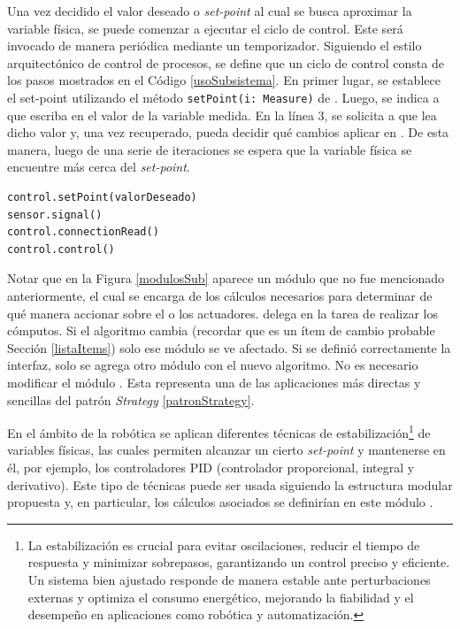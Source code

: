 Una vez decidido el valor deseado o \textit{set-point} al cual se busca aproximar la variable física, se puede comenzar a ejecutar el ciclo de control. Este será invocado de manera periódica mediante un temporizador. Siguiendo el estilo arquitectónico de control de procesos, se define que un ciclo de control consta de los pasos mostrados en el Código \ref{usoSubsistema}. En primer lugar, se establece el set-point utilizando el método \verb|setPoint(i: Measure)| de \Control. Luego, se indica a \Sensor que escriba en \Pipe el valor de la variable medida. En la línea 3, se solicita a \Control que lea dicho valor y, una vez recuperado, pueda decidir qué cambios aplicar en \Actuador. De esta manera, luego de una serie de iteraciones se espera que la variable física se encuentre más cerca del \textit{set-point}.

\begin{lstlisting}[caption=Ejemplo de uso del subsistema.,label={usoSubsistema}]
control.setPoint(valorDeseado)
sensor.signal()
control.connectionRead()
control.control()
\end{lstlisting}

Notar que en la Figura \ref{modulosSub} aparece un módulo que no fue mencionado anteriormente, \Algoritmo el cual se encarga de los cálculos necesarios para determinar de qué manera accionar sobre el o los actuadores. \Control delega en \Algoritmo la tarea de realizar los cómputos. Si el algoritmo cambia (recordar que es un ítem de cambio probable Sección \ref{listaItems}) solo ese módulo se ve afectado. Si se definió correctamente la interfaz, solo se agrega otro módulo con el nuevo algoritmo. No es necesario modificar el módulo \Control. Esta representa una de las aplicaciones más directas y sencillas del patrón \textit{Strategy} \ref{patronStrategy}.

En el ámbito de la robótica se aplican diferentes técnicas de estabilización\footnote{La estabilización es crucial para evitar oscilaciones, reducir el tiempo de respuesta y minimizar sobrepasos, garantizando un control preciso y eficiente. Un sistema bien ajustado responde de manera estable ante perturbaciones externas y optimiza el consumo energético, mejorando la fiabilidad y el desempeño en aplicaciones como robótica y automatización.} de variables físicas, las cuales permiten alcanzar un cierto \textit{set-point} y mantenerse en él, por ejemplo, los controladores \gls{PID}\cite{pidlibro} (controlador proporcional, integral y derivativo). Este tipo de técnicas puede ser usada siguiendo la estructura modular propuesta y, en particular, los cálculos asociados se definirían en este módulo \Algoritmo.

